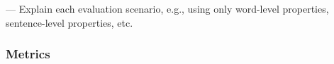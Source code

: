 --- Explain each evaluation scenario, e.g., using only word-level properties, sentence-level properties, etc.



\subsubsection{Metrics}










    
 















